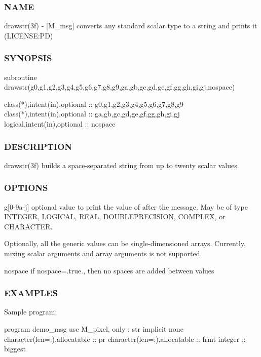 \subsubsection*{N\+A\+ME}

drawstr(3f) -\/ \mbox{[}M\+\_\+msg\mbox{]} converts any standard scalar type to a string and prints it (L\+I\+C\+E\+N\+SE\+:PD) 

\subsubsection*{S\+Y\+N\+O\+P\+S\+IS}

\begin{DoxyVerb}subroutine drawstr(g0,g1,g2,g3,g4,g5,g6,g7,g8,g9,ga,gb,gc,gd,ge,gf,gg,gh,gi,gj,nospace)

 class(*),intent(in),optional  :: g0,g1,g2,g3,g4,g5,g6,g7,g8,g9
 class(*),intent(in),optional  :: ga,gb,gc,gd,ge,gf,gg,gh,gi,gj
 logical,intent(in),optional   :: nospace
\end{DoxyVerb}


\subsubsection*{D\+E\+S\+C\+R\+I\+P\+T\+I\+ON}

drawstr(3f) builds a space-\/separated string from up to twenty scalar values.

\subsubsection*{O\+P\+T\+I\+O\+NS}

g\mbox{[}0-\/9a-\/j\mbox{]} optional value to print the value of after the message. May be of type I\+N\+T\+E\+G\+ER, L\+O\+G\+I\+C\+AL, R\+E\+AL, D\+O\+U\+B\+L\+E\+P\+R\+E\+C\+I\+S\+I\+ON, C\+O\+M\+P\+L\+EX, or C\+H\+A\+R\+A\+C\+T\+ER.

Optionally, all the generic values can be single-\/dimensioned arrays. Currently, mixing scalar arguments and array arguments is not supported.

nospace if nospace=.true., then no spaces are added between values

\subsubsection*{E\+X\+A\+M\+P\+L\+ES}

Sample program\+:

program demo\+\_\+msg use M\+\_\+pixel, only \+: str implicit none character(len=\+:),allocatable \+:\+: pr character(len=\+:),allocatable \+:\+: frmt integer \+:\+: biggest

